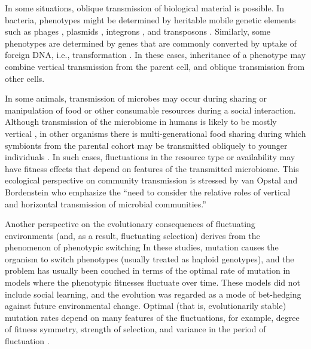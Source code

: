 \documentclass[9pt,twocolumn,twoside,lineno]{pnas-new}
\begin{document}
In some situations, oblique transmission of biological material is possible.
In bacteria, phenotypes might be determined by heritable mobile genetic elements such as phages \cite{zinder1952genetic}, plasmids \cite{lederberg1946gene}, integrons \cite{mazel2006integrons}, and transposons \cite{salyers2004conjugative}.
Similarly, some phenotypes are determined by genes that are commonly converted by uptake of foreign DNA, i.e., transformation \cite{milkman1990molecular}.
In these cases, inheritance of a phenotype may combine vertical transmission from the parent cell, and oblique transmission from other cells. 

In some animals, transmission of microbes may occur during sharing or manipulation of food or other consumable resources during a social interaction. Although transmission of the microbiome in humans is likely to be mostly vertical \cite{rosenberg2016microbes}, in other organisms there is multi-generational food sharing during which symbionts from the parental cohort may be transmitted obliquely to younger individuals \cite{theis2016getting}. In such cases, fluctuations in the resource type or availability may have fitness effects that depend on features of the transmitted microbiome. This ecological perspective on community transmission is stressed by van Opstal and Bordenstein \cite{van2015rethinking} who emphasize the ``need to consider the relative roles of vertical and horizontal transmission of microbial communities.''

Another perspective on the evolutionary consequences of fluctuating environments (and, as a result, fluctuating selection) derives from the phenomenon of phenotypic switching \cite{balaban2004bacterial,kussell2005phenotypic,thattai2004stochastic,salathe2009evolution,liberman2011evolution,gaal2010exact}
In these studies, mutation causes the organism to switch phenotypes (usually treated as haploid genotypes), and the problem has usually been couched in terms of the optimal rate of mutation in models where the phenotypic fitnesses fluctuate over time. These models did not include social learning, and the evolution was regarded as a mode of bet-hedging against future environmental change. Optimal (that is, evolutionarily stable) mutation rates depend on many features of the fluctuations, for example,  degree of fitness symmetry, strength of selection, and variance in the period of fluctuation \cite{salathe2009evolution}.
\end{document}
